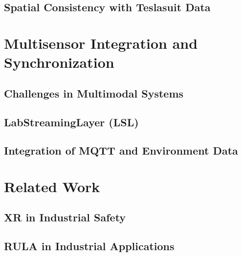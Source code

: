 \subsection{Spatial Consistency with Teslasuit Data}

\section{Multisensor Integration and Synchronization}
\subsection{Challenges in Multimodal Systems}

\subsection{LabStreamingLayer (LSL)}

\subsection{Integration of MQTT and Environment Data}

\section{Related Work}
\subsection{XR in Industrial Safety}
\subsection{RULA in Industrial Applications}
